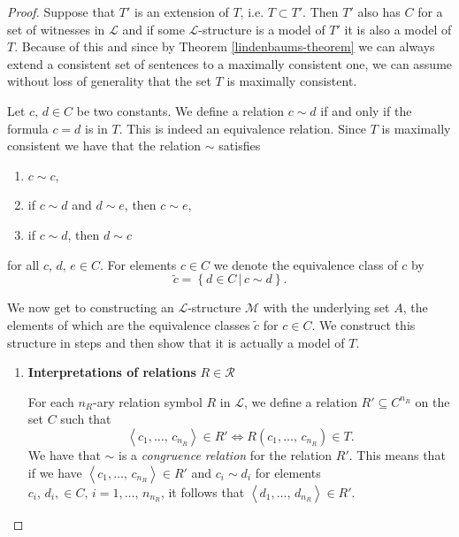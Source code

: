 \documentclass[../../main.tex]{subfiles}
\begin{document}
\begin{proof}
    Suppose that $T'$ is an extension of $T$, i.e. $T \subset T'$.
    Then $T'$ also has $C$ for a set of witnesses in $\mathcal{L}$ and if some $\mathcal{L}$-structure is a model of $T'$ it is also a model of $T$.
    Because of this and since by Theorem \ref{lindenbaums-theorem} we can always extend a consistent set of sentences to a maximally consistent one,
    we can assume without loss of generality that the set $T$ is maximally consistent.

    Let $c,\, d \in C$ be two constants. 
    We define a relation $c \sim d$ if and only if the formula $c = d$ is in $T$.
    This is indeed an equivalence relation.
    Since $T$ is maximally consistent we have that the relation $\sim$ satisfies
    \begin{enumerate}[label=(\roman*)]
        \item $c \sim c$,
        \item if $c \sim d$ and $d \sim e$, then $c \sim e$,
        \item if $c \sim d$, then $d \sim c$
    \end{enumerate}
    for all $c,\, d,\, e \in C$.
    For elements $c \in C$ we denote the equivalence class of $c$ by
    $$\tilde{c} = \left\{d \in C \,\vert\,c \sim d\right\}.$$

    We now get to constructing an $\mathcal{L}$-structure $\mathcal{M}$ with the underlying set $A$,
    the elements of which are the equivalence classes $\tilde{c}$ for $c \in C$.
    We construct this structure in steps and then show that it is actually a model of $T$.
    \begin{enumerate}
        \item \label{lemma-proof-step-1} \textbf{Interpretations of relations} $R \in \mathcal{R}$
        
        For each $n_R$-ary relation symbol $R$ in $\mathcal{L}$,
        we define a relation $R' \subseteq C^{n_R}$ on the set $C$ such that
        \begin{equation}\label{congruence-eq}
            \left<c_1,\ldots,\,c_{n_R}\right> \in R' \iff R(c_1,\ldots,\,c_{n_R}) \in T.
        \end{equation}
        We have that $\sim$ is a \emph{congruence relation} for the relation $R'$.
        This means that if we have $\left<c_1,\ldots,\,c_{n_R}\right> \in R'$ and $c_i \sim d_i$ for elements $c_i,\, d_i, \in C,\, i = 1,\ldots,\, n_{n_R}$, 
        it follows that $\left<d_1,\ldots,\,d_{n_R}\right> \in R'$.
        

\end{enumerate}
\end{proof}
\end{document}
